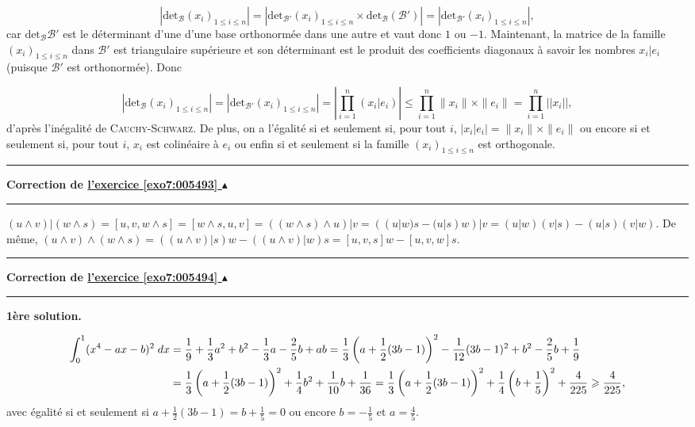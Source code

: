 \documentclass[11pt,a4paper]{article}
\newcounter{exo}
\newcommand{\correction}[1]{\hypertarget{cor7:#1}{}\label{cor7:#1}{\bf Correction de \hyperlink{exo7:#1}{l'exercice \ref{exo7:#1} $\blacktriangle$}}\vspace{1mm}\hrule\vspace{1mm}}
\newcommand{\fincorrection}{\vspace{1mm}\hrule\vspace*{7mm}}
\begin{document}
$$\left|\mbox{det}_{\mathcal{B}}(x_i)_{1\leq i\leq n}\right|=\left|\mbox{det}_{\mathcal{B}'}(x_i)_{1\leq i\leq n}\times\mbox{det}_{\mathcal{B}}(\mathcal{B}')\right|=|\mbox{det}_{\mathcal{B}'}(x_i)_{1\leq i\leq n}|,$$
car $\mbox{det}_{\mathcal{B}}\mathcal{B}'$ est le déterminant d'une d'une base orthonormée dans une autre et vaut donc $1$ ou $-1$.
Maintenant, la matrice de la famille $(x_i)_{1\leq i\leq n}$ dans $\mathcal{B}'$ est triangulaire supérieure et son déterminant est le produit des coefficients diagonaux à savoir les nombres $x_i|e_i$ (puisque $\mathcal{B}'$ est orthonormée). Donc

$$|\mbox{det}_{\mathcal{B}}(x_i)_{1\leq i\leq n}|=|\mbox{det}_{\mathcal{B}'}(x_i)_{1\leq i\leq n}|=\left|\prod_{i=1}^{n}(x_i|e_i)\right|\leq\prod_{i=1}^{n}\|x_i\|\times\|e_i\|=\prod_{i=1}^{n}||x_i||,$$
d'après l'inégalité de \textsc{Cauchy}-\textsc{Schwarz}. De plus, on a l'égalité si et seulement si, pour tout $i$,  $|x_i|e_i|=\|x_i\|\times\|e_i\|$ ou encore si et seulement si, pour tout $i$, $x_i$ est colinéaire à $e_i$ ou enfin si et seulement si la famille $(x_i)_{1\leq i\leq n}$ est orthogonale.
\fincorrection
\correction{005493}
$(u\wedge v)|(w\wedge s)=[u,v,w\wedge s]=[w\wedge s,u,v]=((w\wedge s)\wedge u)|v=((u|w)s-(u|s)w)|v=(u|w)(v|s)-(u|s)(v|w)$.
De même, $(u\wedge v)\wedge(w\wedge s)=((u\wedge v)|s)w-((u\wedge v)|w)s=[u,v,s]w-[u,v,w]s$.
\fincorrection
\correction{005494}
\textbf{1ère solution.}

\begin{align*}\ensuremath
\int_{0}^{1}(x^4-ax-b)^2\;dx&=\frac{1}{9}+\frac{1}{3}a^2+b^2-\frac{1}{3}a-\frac{2}{5}b+ab=\frac{1}{3}\left(a+\frac{1}{2}(3b-1)\right)^2-\frac{1}{12}(3b-1)^2+b^2-\frac{2}{5}b+\frac{1}{9}\\
 &=\frac{1}{3}\left(a+\frac{1}{2}(3b-1)\right)^2+\frac{1}{4}b^2+\frac{1}{10}b+\frac{1}{36}=\frac{1}{3}\left(a+\frac{1}{2}(3b-1)\right)^2+\frac{1}{4}\left(b+\frac{1}{5}\right)^2+\frac{4}{225}\geq\frac{4}{225},
\end{align*}
avec égalité si et seulement si $a+\frac{1}{2}(3b-1)=b+\frac{1}{5}=0$ ou encore $b=-\frac{1}{5}$ et $a=\frac{4}{5}$.
\end{document}

